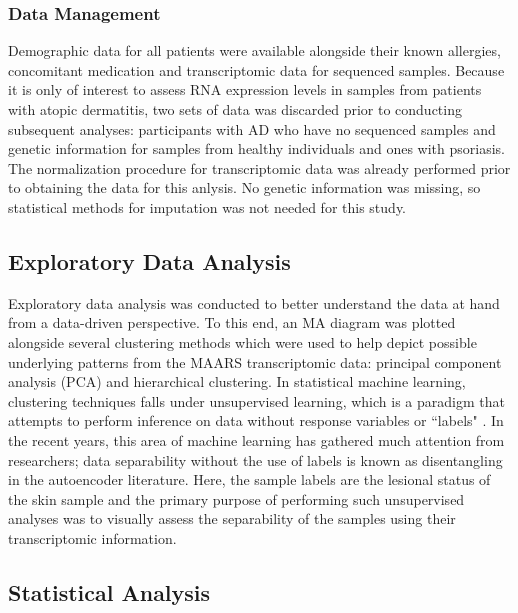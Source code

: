 \documentclass[journal, a4paper]{IEEEtran}
\begin{document}

\subsubsection*{Data Management}

Demographic data for all patients were available alongside their known allergies, concomitant medication and transcriptomic data for sequenced samples. Because it is only of interest to assess RNA expression levels in samples from patients with atopic dermatitis, two sets of data was discarded prior to conducting subsequent analyses: participants with AD who have no sequenced samples and genetic information for samples from healthy individuals and ones with psoriasis. The normalization procedure for transcriptomic data was already performed prior to obtaining the data for this anlysis. No genetic information was missing, so statistical methods for imputation was not needed for this study.


\subsection{Exploratory Data Analysis}

Exploratory data analysis was conducted to better understand the data at hand from a data-driven perspective. To this end, an MA diagram was plotted alongside several clustering methods which were used to help depict possible underlying patterns from the MAARS transcriptomic data: principal component analysis (PCA) and hierarchical clustering\cite{maaten2008visualizing}\cite{friedman2001elements}. In statistical machine learning, clustering techniques falls under unsupervised learning, which is a paradigm that attempts to perform inference on data without response variables or ``labels" \cite{friedman2001elements}. In the recent years, this area of machine learning has gathered much attention from researchers; data separability without the use of labels is known as disentangling in the autoencoder literature\cite{higgins2017beta}\cite{burgess2018understanding}. Here, the sample labels are the lesional status of the skin sample and the primary purpose of performing such unsupervised analyses was to visually assess the separability of the samples using their transcriptomic information.

\subsection{Statistical Analysis}
\end{document}
